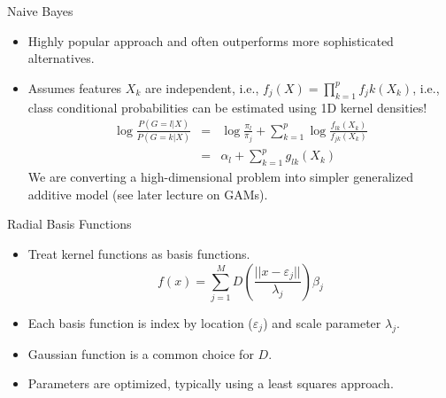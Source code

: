 \documentclass[aspectratio=169]{beamer}
\begin{document}
\begin{frame}{Naive Bayes}
    \begin{itemize}
        \item Highly popular approach and often outperforms more sophisticated alternatives.
        \item Assumes features $X_k$ are independent, i.e., $f_j(X) = \prod_{k=1}^p f_jk(X_k)$, i.e., class conditional probabilities can be estimated using 1D kernel densities!
        \begin{eqnarray*}
        \log{\frac{P(G=l|X)}{P(G=k|X)}} & = & \log{\frac{\pi_l}{\pi_j}} + \sum_{k=1}^p \log{\frac{f_{lk}(X_k)}{f_{jk}(X_k)}}\\
        & = & \alpha_l + \sum_{k=1}^p g_{lk}(X_k)
        \end{eqnarray*}
        We are converting a high-dimensional problem into simpler generalized additive model (see later lecture on GAMs).
    \end{itemize}
\end{frame}


\begin{frame}{Radial Basis Functions}
    \begin{itemize}
        \item Treat kernel functions as basis functions.
        \begin{equation*}
            f(x) = \sum_{j=1}^M D(\frac{||x-\varepsilon_j||}{\lambda_j})\beta_j
        \end{equation*}
        \item Each basis function is index by location ($\varepsilon_j$) and scale parameter $\lambda_j$.
        \item Gaussian function is a common choice for $D$.
        \item Parameters are optimized, typically using a least squares approach.
    \end{itemize}
\end{frame}
\end{document}
